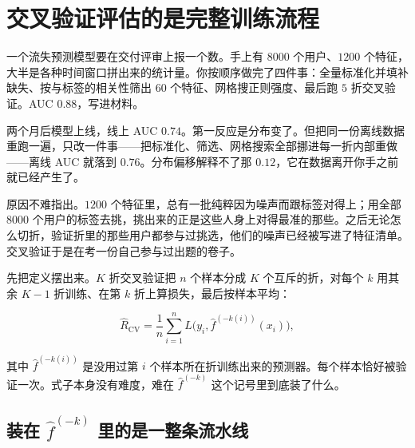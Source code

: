 \section{交叉验证评估的是完整训练流程}
\label{sec:11-Mathematical-Statistics/06-Resampling-and-Model-Selection/03}

一个流失预测模型要在交付评审上报一个数。手上有 \(8000\) 个用户、\(1200\) 个特征，大半是各种时间窗口拼出来的统计量。你按顺序做完了四件事：全量标准化并填补缺失、按与标签的相关性筛出 \(60\) 个特征、网格搜正则强度、最后跑 \(5\) 折交叉验证。AUC \(0.88\)，写进材料。

两个月后模型上线，线上 AUC \(0.74\)。第一反应是分布变了。但把同一份离线数据重跑一遍，只改一件事——把标准化、筛选、网格搜索全部挪进每一折内部重做——离线 AUC 就落到 \(0.76\)。分布偏移解释不了那 \(0.12\)，它在数据离开你手之前就已经产生了。

原因不难指出。\(1200\) 个特征里，总有一批纯粹因为噪声而跟标签对得上；用全部 \(8000\) 个用户的标签去挑，挑出来的正是这些人身上对得最准的那些。之后无论怎么切折，验证折里的那些用户都参与过挑选，他们的噪声已经被写进了特征清单。交叉验证于是在考一份自己参与过出题的卷子。

先把定义摆出来。\(K\) 折交叉验证把 \(n\) 个样本分成 \(K\) 个互斥的折，对每个 \(k\) 用其余 \(K-1\) 折训练、在第 \(k\) 折上算损失，最后按样本平均：

\[
\widehat R_{\mathrm{CV}}=\frac1n\sum_{i=1}^n L\bigl(y_i,\hat f^{(-k(i))}(x_i)\bigr),
\]

其中 \(\hat f^{(-k(i))}\) 是没用过第 \(i\) 个样本所在折训练出来的预测器。每个样本恰好被验证一次。式子本身没有难度，难在 \(\hat f^{(-k)}\) 这个记号里到底装了什么。

\subsection{装在 \(\hat f^{(-k)}\) 里的是一整条流水线}

